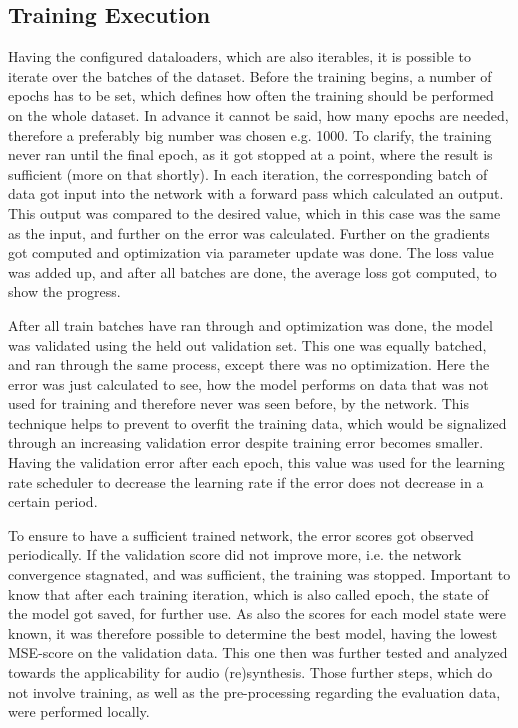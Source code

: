\subsection{Training Execution}
Having the configured dataloaders, which are also iterables, it is possible to iterate over the batches of the dataset. Before the training begins, a number of epochs has to be set, which defines how often the training should be performed on the whole dataset. In advance it cannot be said, how many epochs are needed, therefore a preferably big number was chosen e.g. 1000. To clarify, the training never ran until the final epoch, as it got stopped at a point, where the result is sufficient (more on that shortly). In each iteration, the corresponding batch of data got input into the network with a forward pass which calculated an output. This output was compared to the desired value, which in this case was the same as the input, and further on the error was calculated. Further on the gradients got computed and optimization via parameter update was done. The loss value was added up, and after all batches are done, the average loss got computed, to show the progress. 

After all train batches have ran through and optimization was done, the model was validated using the held out validation set. This one was equally batched, and ran through the same process, except there was no optimization. Here the error was just calculated to see, how the model performs on data that was not used for training and therefore never was seen before, by the network. This technique helps to prevent to overfit the training data, which would be signalized through an increasing validation error despite training error becomes smaller. Having the validation error after each epoch, this value was used for the learning rate scheduler to decrease the learning rate if the error does not decrease in a certain period. 

To ensure to have a sufficient trained network, the error scores got observed periodically. If the validation score did not improve more, i.e. the network convergence stagnated, and was sufficient, the training was stopped. Important to know that after each training iteration, which is also called epoch, the state of the model got saved, for further use. As also the scores for each model state were known, it was therefore possible to determine the best model, having the lowest MSE-score on the validation data. This one then was further tested and analyzed towards the applicability for audio (re)synthesis. Those further steps, which do not involve training, as well as the pre-processing regarding the evaluation data, were performed locally. 

